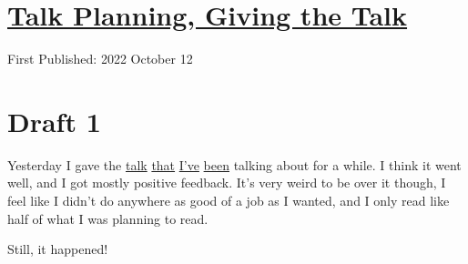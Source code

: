 \documentclass[12pt]{article}[titlepage]
\newcommand{\1}{\={a}}
\newcommand{\2}{\={e}}
\newcommand{\3}{\={\i}}
\newcommand{\4}{\=o}
\newcommand{\5}{\=u}
\newcommand{\6}{\={A}}
\renewcommand{\,}{\textsuperscript{,}}
\begin{document}
\doublespacing
\section{\href{talk-planning-5.html}{Talk Planning, Giving the Talk}}
First Published: 2022 October 12
\section{Draft 1}
Yesterday I gave the \href{talk-planning-1.html}{talk} \href{talk-planning-2.html}{that} \href{talk-planning-3.html}{I've} \href{talk-planning-4.html}{been} talking about for a while.
I think it went well, and I got mostly positive feedback.
It's very weird to be over it though, I feel like I didn't do anywhere as good of a job as I wanted, and I only read like half of what I was planning to read.

Still, it happened!
\end{document}
